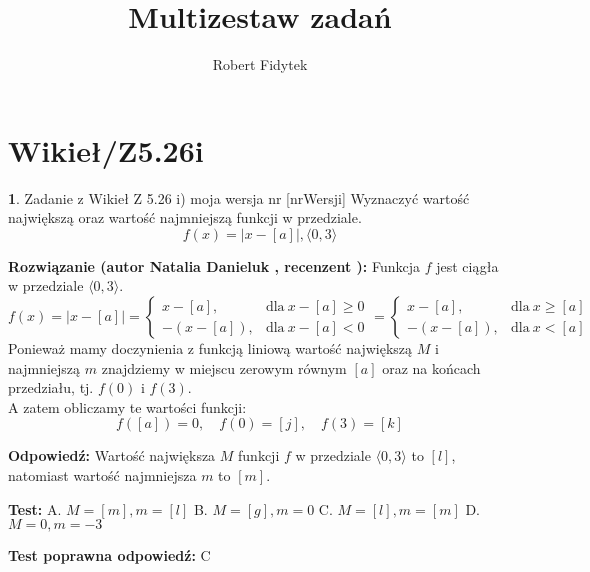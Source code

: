 \documentclass[12pt, a4paper]{article}
\title{Multizestaw zadań}
\author{Robert Fidytek}
\date{}
\theoremstyle{definition} %
\newtheorem{zad}{}
\newcommand{\kategoria}[1]{\section{#1}} %
\newcommand{\zadStart}[1]{\begin{zad}#1\newline} %
\newcommand{\zadStop}{\end{zad}}   %
\newcommand{\rozwStart}[2]{\noindent \textbf{Rozwiązanie (autor #1 , recenzent #2): }\newline} %
\newcommand{\rozwStop}{\newline}                                            %
\newcommand{\odpStart}{\noindent \textbf{Odpowiedź:}\newline}    %
\newcommand{\odpStop}{\newline}                                             %
\newcommand{\testStart}{\noindent \textbf{Test:}\newline} %
\newcommand{\testStop}{\newline} %
\newcommand{\kluczStart}{\noindent \textbf{Test poprawna odpowiedź:}\newline} %
\newcommand{\kluczStop}{\newline} %
\begin{document}
\maketitle

\kategoria{Wikieł/Z5.26i}

\zadStart{Zadanie z Wikieł Z 5.26 i) moja wersja nr [nrWersji]}
Wyznaczyć wartość największą oraz wartość najmniejszą funkcji w przedziale. 
$$f(x) = \mid x - [a] \mid, \langle0,3\rangle$$
\zadStop

\rozwStart{Natalia Danieluk}{}
Funkcja $f$ jest ciągła w przedziale $\langle0,3\rangle$. 
$$ f(x) = \mid x - [a] \mid =  
\begin{cases} 
x - [a], & \text{dla} \ x - [a] \ge 0 \\
- (x - [a]), & \text{dla}\ x - [a] < 0
\end{cases} 
=  
\begin{cases} 
x - [a], & \text{dla} \ x \ge [a] \\
- (x - [a]), & \text{dla}\ x < [a]
\end{cases} 
$$
Ponieważ mamy doczynienia z funkcją liniową wartość największą $M$ i najmniejszą $m$ znajdziemy w miejscu zerowym równym $[a]$ oraz na końcach przedziału, tj. $f(0)$ i $f(3)$. \\
A zatem obliczamy te wartości funkcji:
$$ f([a]) = 0,\quad f(0) = [j],\quad f(3) = [k] $$
\rozwStop

\odpStart
Wartość największa $M$ funkcji $f$ w przedziale $\langle0,3\rangle$ to $[l]$, natomiast wartość najmniejsza $m$ to $[m]$.
\odpStop

\testStart
A. $M=[m], m=[l]$
B. $M=[g], m=0$
C. $M=[l], m=[m]$
D. $M=0, m=-3$
\testStop

\kluczStart
C
\kluczStop
\end{document}
